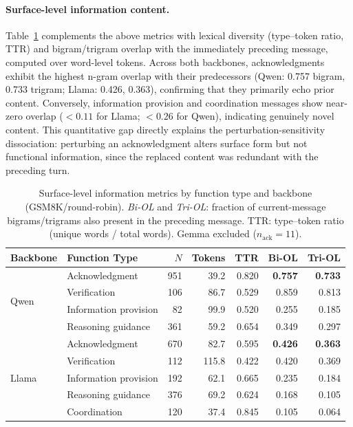 \paragraph{Surface-level information content.}
Table~\ref{tab:surface_info} complements the above metrics with lexical diversity (type--token ratio, TTR) and bigram/trigram overlap with the immediately preceding message, computed over word-level tokens.
Across both backbones, acknowledgments exhibit the highest n-gram overlap with their predecessors (Qwen: 0.757 bigram, 0.733 trigram; Llama: 0.426, 0.363), confirming that they primarily echo prior content.
Conversely, information provision and coordination messages show near-zero overlap ($< 0.11$ for Llama; $< 0.26$ for Qwen), indicating genuinely novel content.
This quantitative gap directly explains the perturbation-sensitivity dissociation: perturbing an acknowledgment alters surface form but not functional information, since the replaced content was redundant with the preceding turn.

\begin{table}[ht]
\centering
\caption{Surface-level information metrics by function type and backbone (GSM8K/round-robin). \textit{Bi-OL} and \textit{Tri-OL}: fraction of current-message bigrams/trigrams also present in the preceding message. TTR: type--token ratio (unique words / total words). Gemma excluded ($n_\text{ack} = 11$).}
\label{tab:surface_info}
\small
\begin{tabular}{@{}llrrrrr@{}}
\toprule
\textbf{Backbone} & \textbf{Function Type} & \textbf{$N$} & \textbf{Tokens} & \textbf{TTR} & \textbf{Bi-OL} & \textbf{Tri-OL} \\
\midrule
\multirow{4}{*}{Qwen}
  & Acknowledgment        & 951 & 39.2  & 0.820 & \textbf{0.757} & \textbf{0.733} \\
  & Verification          & 106 & 86.7  & 0.529 & 0.859 & 0.813 \\
  & Information provision  &  82 & 99.9  & 0.520 & 0.255 & 0.185 \\
  & Reasoning guidance    & 361 & 59.2  & 0.654 & 0.349 & 0.297 \\
\midrule
\multirow{5}{*}{Llama}
  & Acknowledgment        & 670 & 82.7  & 0.595 & \textbf{0.426} & \textbf{0.363} \\
  & Verification          & 112 & 115.8 & 0.422 & 0.420 & 0.369 \\
  & Information provision  & 192 & 62.1  & 0.665 & 0.235 & 0.184 \\
  & Reasoning guidance    & 376 & 69.2  & 0.624 & 0.168 & 0.105 \\
  & Coordination          & 120 & 37.4  & 0.845 & 0.105 & 0.064 \\
\bottomrule
\end{tabular}
\end{table}

